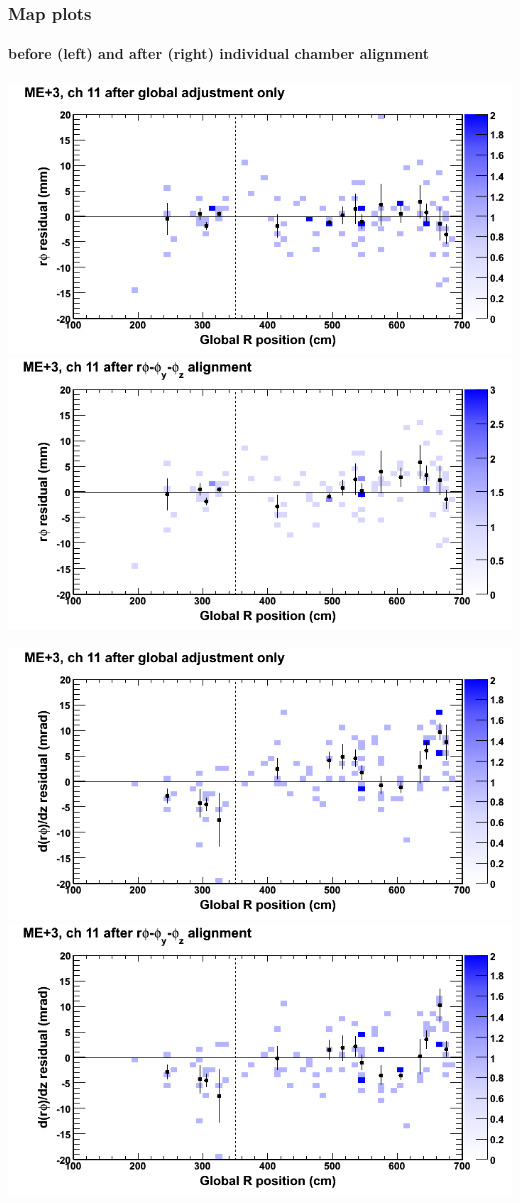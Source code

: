 \documentclass[compress]{beamer}
\begin{document}
\begin{frame}
\frametitle{Map plots}
\framesubtitle{before (left) and after (right) individual chamber alignment}
\includegraphics[width=0.5\linewidth]{ringmapplots_3dof/before_CSCvsr_mep3ch11_x.png} \includegraphics[width=0.5\linewidth]{ringmapplots_3dof/after_CSCvsr_mep3ch11_x.png}

\includegraphics[width=0.5\linewidth]{ringmapplots_3dof/before_CSCvsr_mep3ch11_dxdz.png} \includegraphics[width=0.5\linewidth]{ringmapplots_3dof/after_CSCvsr_mep3ch11_dxdz.png}
\end{frame}
\end{document}
